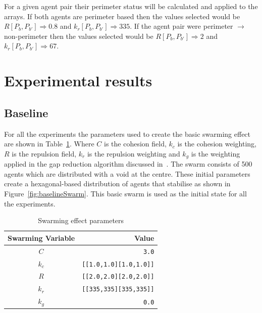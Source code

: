 \documentclass[12pt,a4paper]{IEEEtran}
\newcommand{\kc}{\mathit{k_c}}
\newcommand{\kr}{\mathit{k_r}}
\newcommand{\kg}{\mathit{k_g}}
\newcommand{\rb}{\mathit{R}}
\begin{document}
For a given agent pair their perimeter status will be calculated and applied to the arrays. If both agents are perimeter based then the values selected would be $\rb[P_b,P_{b'}]\Rightarrow 0.8$ and $\kr[P_b,P_{b'}]\Rightarrow 335$. If the agent pair were perimeter $\rightarrow$ non-perimeter then the values selected would be $\rb[P_b,P_{b'}]\Rightarrow 2$ and $\kr[P_b,P_{b'}]\Rightarrow 67$.\\

\section{Experimental results\label{sec:ExperimentalResults}}
\subsection{Baseline}
For all the experiments the parameters used to create the basic swarming effect are shown in Table~\ref{tab:swarmingEffect}. Where $C$ is the cohesion field, $\kc$ is the cohesion weighting, $\rb$ is the repulsion field, $\kr$ is the repulsion weighting and $\kg$ is the weighting applied in the gap reduction algorithm discussed in~\cite{eliot2019void}. The swarm consists of 500 agents which are distributed with a void at the centre. These initial parameters create a hexagonal-based distribution of agents that stabilise as shown in Figure~\ref{fig:baselineSwarm}. This basic swarm is used as the initial state for all the experiments. 
 \begin{table}[H]
	\centering
	\tiny
	\begin{tabular}{|c|r|}
		\hline
		\rowcolor[HTML]{000000} 
		{\color[HTML]{FFFFFF} Swarming Variable} & {\color[HTML]{FFFFFF} Value} \\ \hline
		$C$ & \texttt{3.0} \\ \hline
		$k_c$ & \texttt{[[1.0,1.0][1.0,1.0]]}  \\ \hline
		$R$ & \texttt{[[2.0,2.0][2.0,2.0]]} \\ \hline
		$k_r$ & \texttt{[[335,335][335,335]]} \\ \hline
		$k_g$ & \texttt{0.0} \\ \hline
	\end{tabular}
  	\caption{Swarming effect parameters}
  	\label{tab:swarmingEffect}
\end{table}
\end{document}
